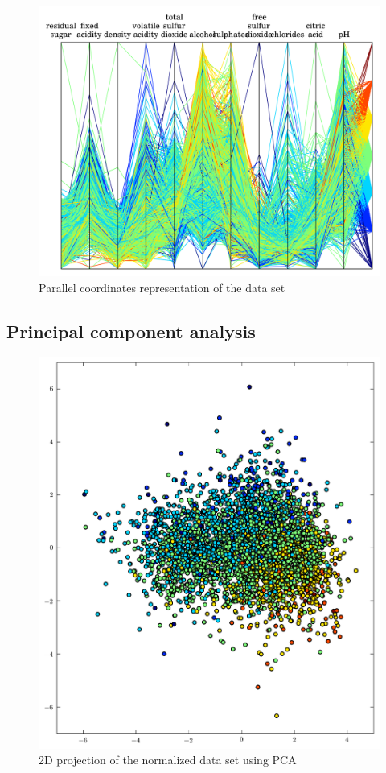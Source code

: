 \documentclass{report}
\begin{document}
\begin{figure}[H]
\includegraphics[width=\textwidth]{parallel_coords.png}
\caption{Parallel coordinates representation of the data set}
\end{figure}

\subsection{Principal component analysis}
\begin{figure}[H]
\includegraphics[width=\textwidth]{pca.png}
\caption{2D projection of the normalized data set using PCA}\end{figure}
\end{document}
